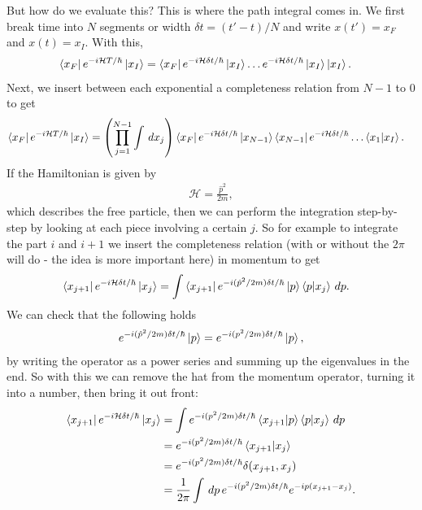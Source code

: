 \documentclass{book}
\theoremstyle{definition}
\newcommand{\ham}{\mathcal{H}}
\newcommand{\f}[2]{\frac{#1}{#2}}
\newcommand{\lp}{\left(}
\newcommand{\rp}{\right)}
\begin{document}
But how do we evaluate this? This is where the path integral comes in. We first break time into $N$ segments or width $\delta t = (t' - t)/N$ and write $x(t') = x_F$ and $x(t) = x_I$. With this,
\begin{align}
\bra{x_F}e^{-i\ham T / \hbar}\ket{x_I} &= \bra{x_F}e^{-i\ham \delta t / \hbar}\ket{x_I} \dots e^{-i\ham \delta t / \hbar}\ket{x_I} \ket{x_I}.
\end{align}
Next, we insert between each exponential a completeness relation from $N-1$ to $0$ to get
\begin{align}\label{path}
\bra{x_F}e^{-i\ham T / \hbar}\ket{x_I} &= \lp\prod_{j=1}^{N-1}\int \,dx_j \rp\bra{x_F}e^{-i\ham \delta t / \hbar}\ket{x_{N-1}}\bra{x_{N-1}}e^{-i\ham \delta t / \hbar}\dots \bra{x_1}\ket{x_I}.
\end{align}
If the Hamiltonian is given by
\begin{align}
\ham = \f{\hat{p}^2}{2m},
\end{align}
which describes the free particle, then we can perform the integration step-by-step by looking at each piece involving a certain $j$. So for example to integrate the part $i$ and $i+1$ we insert the completeness relation (with or without the $2\pi$ will do - the idea is more important here) in momentum to get
\begin{align}
\bra{x_{j+1}}e^{-i\ham \delta t / \hbar} \ket{x_j}
&= \int \bra{x_{j+1}} e^{-i(\hat{p}^2/2m) \delta t / \hbar}  \ket{p}\braket{p}{x_j} \,dp.
\end{align}
We can check that the following holds
\begin{align}
e^{-i(\hat{p}^2/2m) \delta t / \hbar}  \ket{p} =  e^{-i(p^2/2m) \delta t / \hbar} \ket{p},
\end{align}
by writing the operator as a power series and summing up the eigenvalues in the end. So with this we can remove the hat from the momentum operator, turning it into a number, then bring it out front:
\begin{align}
\bra{x_{j+1}}e^{-i\ham \delta t / \hbar} \ket{x_j} &=
\int  e^{-i({p}^2/2m) \delta t / \hbar}\braket{x_{j+1}}{p}\braket{p}{x_j} \,dp\\
&= e^{-i({p}^2/2m) \delta t / \hbar}\braket{x_{j+1}}{x_j}\\
&= e^{-i({p}^2/2m) \delta t / \hbar}\delta(x_{j+1}, x_j)\\
&= \f{1}{2\pi}\int\,dp \, e^{-i({p}^2/2m) \delta t / \hbar} e^{-ip(x_{j+1} - x_j)}.
\end{align}
\end{document}
